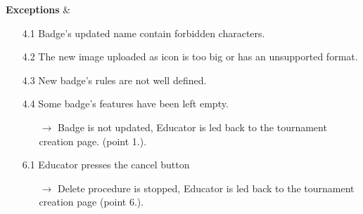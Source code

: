 \documentclass{article}
\begin{document}
{\begin{enumerate}
\begin{xltabular}{\textwidth}
              \hline
              \textbf{Exceptions} &    \begin{itemize}
                  \item[4.1] Badge's updated name contain forbidden characters.
                  \item[4.2] The new image uploaded as icon is too big or has an unsupported format.
                  \item[4.3] New badge's rules are not well defined.
                  \item[4.4] Some badge's features have been left empty.
                        \begin{itemize}
                            \item[$\rightarrow$] Badge is not updated, Educator is led back to
                                  the tournament creation page. (point 1.).
                        \end{itemize}
                  \item[6.1] Educator presses the cancel button
                        \begin{itemize}
                            \item[$\rightarrow$] Delete procedure is stopped, Educator
                                  is led back to the tournament creation page (point 6.).
                        \end{itemize}

              \end{itemize}
          \end{xltabular}


\end{enumerate}}
\end{document}
